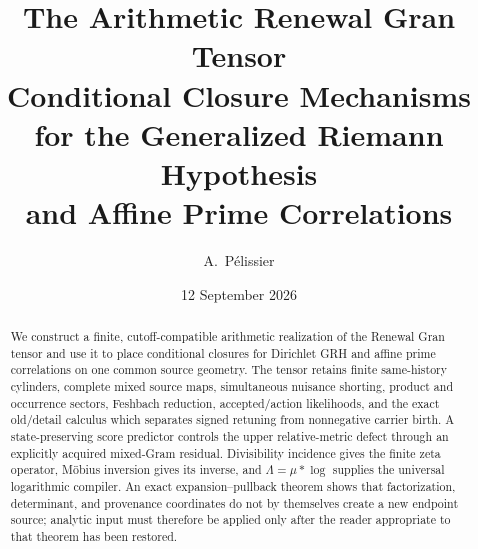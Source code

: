 \documentclass[11pt]{article}
\title{\textbf{The Arithmetic Renewal Gran Tensor}\\[0.35em]
\Large Conditional Closure Mechanisms for the Generalized Riemann Hypothesis\\
and Affine Prime Correlations}
\author{A.~P\'elissier}
\date{12 September 2026}
\theoremstyle{definition}
\theoremstyle{remark}
\begin{document}
\maketitle

\begin{abstract}
We construct a finite, cutoff-compatible arithmetic realization of the
Renewal Gran tensor and use it to place conditional closures for Dirichlet
GRH and affine prime correlations on one common source geometry.  The tensor
retains finite same-history cylinders, complete mixed source maps,
simultaneous nuisance shorting, product and occurrence sectors, Feshbach
reduction, accepted/action likelihoods, and the exact old/detail calculus
which separates signed retuning from nonnegative carrier birth.  A
state-preserving score predictor controls the upper relative-metric defect
through an explicitly acquired mixed-Gram residual.  Divisibility
incidence gives the finite zeta operator, M\"obius inversion gives its inverse,
and $\Lambda=\mu*\log$ supplies the universal logarithmic compiler.  An exact
expansion--pullback theorem shows that factorization, determinant, and
provenance coordinates do not by themselves create a new endpoint source;
analytic input must therefore be applied only after the reader appropriate to
that theorem has been restored.


\end{abstract}
\end{document}

